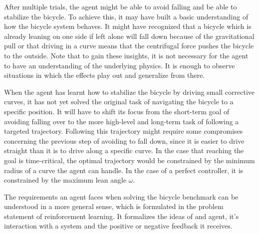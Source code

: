 After multiple trials, the agent might be able to avoid falling and be able to stabilize the bicycle.
To achieve this, it may have built a basic understanding of how the bicycle system behaves.
It might have recognized that a bicycle which is already leaning on one side if left alone will fall down because of the gravitational pull or that driving in a curve means that the centrifugal force pushes the bicycle to the outside.
Note that to gain these insights, it is not necessary for the agent to have an understanding of the underlying physics.
It is enough to observe situations in which the effects play out and generalize from there.

When the agent has learnt how to stabilize the bicycle by driving small corrective curves, it has not yet solved the original task of navigating the bicycle to a specific position.
It will have to shift its focus from the short-term goal of avoiding falling over to the more high-level and long-term task of following a targeted trajectory.
Following this trajectory might require some compromises concerning the previous step of avoiding to fall down, since it is easier to drive straight than it is to drive along a specific curve.
In the case that reaching the goal is time-critical, the optimal trajectory would be constrained by the minimum radius of a curve the agent can handle.
In the case of a perfect controller, it is constrained by the maximum lean angle $\omega$.

The requirements an agent faces when solving the bicycle benchmark can be understood in a more general sense, which is formulated in the problem statement of reinforcement learning.
It formalizes the ideas of and agent, it's interaction with a system and the positive or negative feedback it receives.

